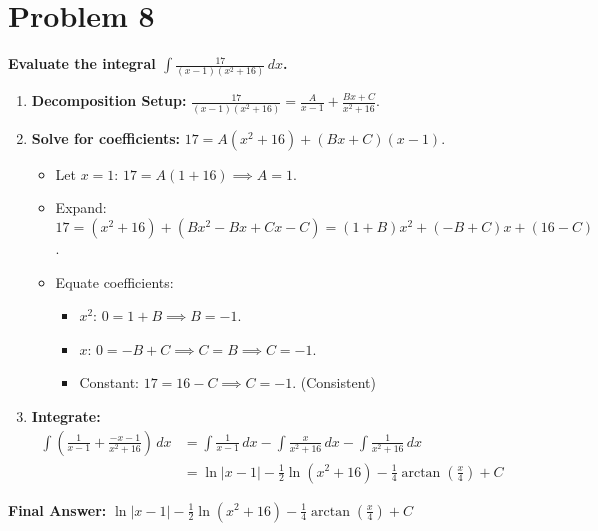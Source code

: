 \documentclass{article}
\begin{document}
\section{Problem 8}
\textbf{Evaluate the integral $\displaystyle\int \frac{17}{(x-1)(x^2+16)} \,dx$.}
\begin{enumerate}
    \item \textbf{Decomposition Setup:} $\displaystyle\frac{17}{(x-1)(x^2+16)} = \frac{A}{x-1} + \frac{Bx+C}{x^2+16}$.
    \item \textbf{Solve for coefficients:} $17 = A(x^2+16) + (Bx+C)(x-1)$.
    \begin{itemize}
        \item Let $x=1$: $17 = A(1+16) \implies A=1$.
        \item Expand: $17 = (x^2+16) + (Bx^2-Bx+Cx-C) = (1+B)x^2 + (-B+C)x + (16-C)$.
        \item Equate coefficients:
        \begin{itemize}
            \item $x^2$: $0 = 1+B \implies B=-1$.
            \item $x$: $0 = -B+C \implies C=B \implies C=-1$.
            \item Constant: $17 = 16-C \implies C=-1$. (Consistent)
        \end{itemize}
    \end{itemize}
    \item \textbf{Integrate:}
    \begin{align*}
    \int \left( \frac{1}{x-1} + \frac{-x-1}{x^2+16} \right) \,dx &= \int \frac{1}{x-1} \,dx - \int \frac{x}{x^2+16} \,dx - \int \frac{1}{x^2+16} \,dx \\
    &= \ln|x-1| - \frac{1}{2}\ln(x^2+16) - \frac{1}{4}\arctan\left(\frac{x}{4}\right) + C
    \end{align*}
\end{enumerate}
\textbf{Final Answer:} $\displaystyle\ln|x-1| - \frac{1}{2}\ln(x^2+16) - \frac{1}{4}\arctan\left(\frac{x}{4}\right) + C$
\end{document}

